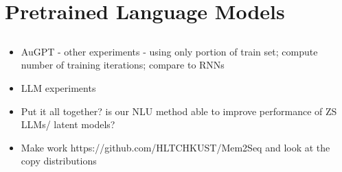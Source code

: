 \section{Pretrained Language Models}
\subsection{\todo{}}
\begin{itemize}
    \item AuGPT - other experiments - using only portion of train set; compute number of training iterations; compare to RNNs
    \item LLM experiments
    \item Put it all together? is our NLU method able to improve performance of ZS LLMs/ latent models?
    \item Make work https://github.com/HLTCHKUST/Mem2Seq and look at the copy distributions
\end{itemize}